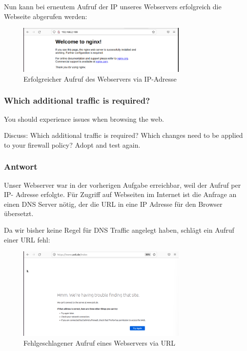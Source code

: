 \documentclass{article}
\begin{document}
Nun kann bei erneutem Aufruf der IP unseres Webservers erfolgreich die Webseite 
abgerufen werden:

\begin{figure}[H]
	\includegraphics[width=0.75\textwidth]{images/06}
	\centering
	\caption{Erfolgreicher Aufruf des Webservers via IP-Adresse}
\end{figure}

\subsubsection{Which additional traffic is required?}

You should experience issues when browsing the web. 

Discuss: Which additional traffic is required? Which changes need to be applied to 
your firewall policy? Adopt and test again. 

\subsubsection*{Antwort}

Unser Webserver war in der vorherigen Aufgabe erreichbar, weil der Aufruf per IP-
Adresse erfolgte. Für Zugriff auf Webseiten im Internet ist die Anfrage an einen DNS 
Server nötig, der die URL in eine IP Adresse für den Browser übersetzt.

Da wir bisher keine Regel für DNS Traffic angelegt haben, schlägt ein Aufruf einer 
URL fehl:

\begin{figure}[H]
	\includegraphics[width=0.75\textwidth]{images/07}
	\centering
	\caption{Fehlgeschlagener Aufruf eines Webservers via URL}
\end{figure}
\end{document}
